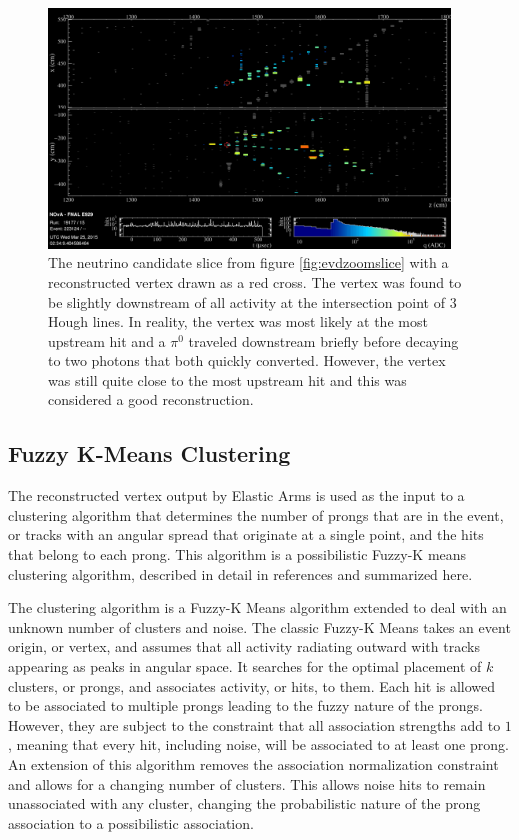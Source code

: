 \begin{figure}[htb]
  \centering
  \includegraphics[width=0.95\textwidth]{figures/evd/ZoomVtx.png}
  \caption[An Example Neutrino Candidate Slice with a Reconstructed Vertex]{The neutrino candidate slice from figure \ref{fig:evdzoomslice} with a reconstructed vertex drawn as a red cross. The vertex was found to be slightly downstream of all activity at the intersection point of $3$ Hough lines. In reality, the vertex was most likely at the most upstream hit and a $\pi^0$ traveled downstream briefly before decaying to two photons that both quickly converted. However, the vertex was still quite close to the most upstream hit and this was considered a good reconstruction.}
  \label{fig:evdVtx}
\end{figure}

\subsection{Fuzzy K-Means Clustering}
\label{sec:RecoFuzzyK}

The reconstructed vertex output by Elastic Arms is used as the input to a clustering algorithm that determines the number of prongs that are in the event, or tracks with an angular spread that originate at a single point, and the hits that belong to each prong. This algorithm is a possibilistic Fuzzy-K means clustering algorithm, described in detail in references \cite{ref:TNFuzzyK, ref:ThesisEvan} and summarized here.

The clustering algorithm is a Fuzzy-K Means algorithm extended to deal with an unknown number of clusters and noise. The classic Fuzzy-K Means \cite{ref:RecoFuzzy1, ref:RecoFuzzy2} takes an event origin, or vertex, and assumes that all activity radiating outward with tracks appearing as peaks in angular space. It searches for the optimal placement of $k$ clusters, or prongs, and associates activity, or hits, to them. Each hit is allowed to be associated to multiple prongs leading to the fuzzy nature of the prongs. However, they are subject to the constraint that all association strengths add to $1$, meaning that every hit, including noise, will be associated to at least one prong. An extension of this algorithm \cite{ref:RecoFuzzyExt} removes the association normalization constraint and allows for a changing number of clusters. This allows noise hits to remain unassociated with any cluster, changing the probabilistic nature of the prong association to a possibilistic association.

